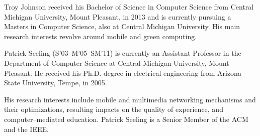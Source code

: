 \documentclass[journal,final]{IEEEtran}
\begin{document}
\begin{IEEEbiography}{Troy Johnson}
received his Bachelor of Science in Computer Science from Central Michigan University, Mount Pleasant, in 2013 and is currently pursuing a Masters in Computer Science, also at Central Michigan University. His main research interests revolve around mobile and green computing.
 \end{IEEEbiography}

 \begin{IEEEbiography}{Patrick Seeling} (S'03--M'05--SM'11)
 is currently an Assistant Professor in the Department of Computer Science at Central Michigan University, Mount Pleasant.
He received his Ph.D. degree in electrical engineering from Arizona State University, Tempe, in 2005.

His research interests include mobile and multimedia networking mechanisms and their optimizations, resulting impacts on the quality of experience, and computer--mediated education. 
Patrick Seeling is a Senior Member of the ACM and the IEEE.
 \end{IEEEbiography}
\end{document}
